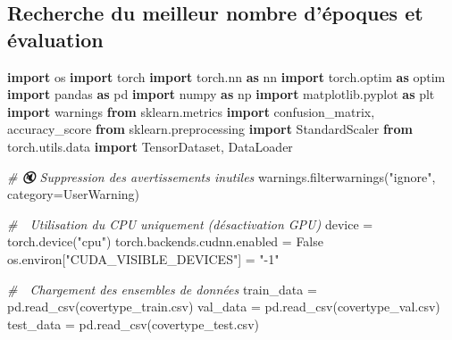 \documentclass[
  letterpaper,
  DIV=11,
  numbers=noendperiod]{scrartcl}
\newenvironment{Shaded}{}{}
\newcommand{\CommentTok}[1]{\textcolor[rgb]{0.38,0.63,0.69}{\textit{#1}}}
\newcommand{\ImportTok}[1]{\textcolor[rgb]{0.00,0.50,0.00}{\textbf{#1}}}
\newcommand{\NormalTok}[1]{#1}
\newcommand{\OperatorTok}[1]{\textcolor[rgb]{0.40,0.40,0.40}{#1}}
\newcommand{\PreprocessorTok}[1]{\textcolor[rgb]{0.74,0.48,0.00}{#1}}
\newcommand{\StringTok}[1]{\textcolor[rgb]{0.25,0.44,0.63}{#1}}
\newcommand{\VariableTok}[1]{\textcolor[rgb]{0.10,0.09,0.49}{#1}}
\begin{document}
\subsection{Recherche du meilleur nombre d'époques et
évaluation}\label{recherche-du-meilleur-nombre-duxe9poques-et-uxe9valuation}

\begin{Shaded}
\begin{Highlighting}[]
\ImportTok{import}\NormalTok{ os}
\ImportTok{import}\NormalTok{ torch}
\ImportTok{import}\NormalTok{ torch.nn }\ImportTok{as}\NormalTok{ nn}
\ImportTok{import}\NormalTok{ torch.optim }\ImportTok{as}\NormalTok{ optim}
\ImportTok{import}\NormalTok{ pandas }\ImportTok{as}\NormalTok{ pd}
\ImportTok{import}\NormalTok{ numpy }\ImportTok{as}\NormalTok{ np}
\ImportTok{import}\NormalTok{ matplotlib.pyplot }\ImportTok{as}\NormalTok{ plt}
\ImportTok{import}\NormalTok{ warnings}
\ImportTok{from}\NormalTok{ sklearn.metrics }\ImportTok{import}\NormalTok{ confusion\_matrix, accuracy\_score}
\ImportTok{from}\NormalTok{ sklearn.preprocessing }\ImportTok{import}\NormalTok{ StandardScaler}
\ImportTok{from}\NormalTok{ torch.utils.data }\ImportTok{import}\NormalTok{ TensorDataset, DataLoader}

\CommentTok{\# 🔇 Suppression des avertissements inutiles}
\NormalTok{warnings.filterwarnings(}\StringTok{"ignore"}\NormalTok{, category}\OperatorTok{=}\PreprocessorTok{UserWarning}\NormalTok{)}

\CommentTok{\# 🔌 Utilisation du CPU uniquement (désactivation GPU)}
\NormalTok{device }\OperatorTok{=}\NormalTok{ torch.device(}\StringTok{"cpu"}\NormalTok{)}
\NormalTok{torch.backends.cudnn.enabled }\OperatorTok{=} \VariableTok{False}
\NormalTok{os.environ[}\StringTok{"CUDA\_VISIBLE\_DEVICES"}\NormalTok{] }\OperatorTok{=} \StringTok{"{-}1"}

\CommentTok{\# 🔄 Chargement des ensembles de données}
\NormalTok{train\_data }\OperatorTok{=}\NormalTok{ pd.read\_csv(}\StringTok{\textquotesingle{}covertype\_train.csv\textquotesingle{}}\NormalTok{)}
\NormalTok{val\_data }\OperatorTok{=}\NormalTok{ pd.read\_csv(}\StringTok{\textquotesingle{}covertype\_val.csv\textquotesingle{}}\NormalTok{)}
\NormalTok{test\_data }\OperatorTok{=}\NormalTok{ pd.read\_csv(}\StringTok{\textquotesingle{}covertype\_test.csv\textquotesingle{}}\NormalTok{)}


\end{Highlighting}
\end{Shaded}
\end{document}
